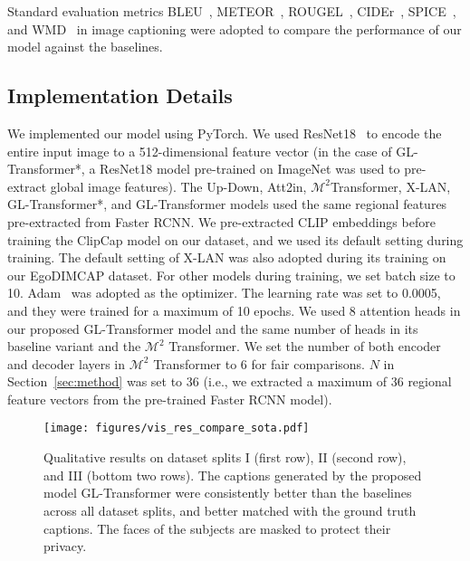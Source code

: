 \documentclass[journal]{IEEEtran}
\begin{document}
Standard evaluation metrics BLEU~\cite{papineni2002bleu}, METEOR~\cite{denkowski2014meteor}, ROUGEL~\cite{lin2004rouge}, CIDEr~\cite{vedantam2015cider}, SPICE~\cite{anderson2016spice}, and WMD~\cite{kusner2015word} in image captioning were adopted to compare the performance of our model against the baselines.

\subsection{Implementation Details}\label{subsec:implementation_details}

We implemented our model using PyTorch. We used ResNet18~\cite{he2016deep} to encode the entire input image to a 512-dimensional feature vector (in the case of GL-Transformer*, a ResNet18 model pre-trained on ImageNet was used to pre-extract global image features). The Up-Down, Att2in, $\mathcal{M}^2$Transformer, X-LAN, GL-Transformer*, and GL-Transformer models used the same regional features pre-extracted from Faster RCNN. We pre-extracted CLIP embeddings before training the ClipCap model on our dataset, and we used its default setting during training. The default setting of X-LAN was also adopted during its training on our EgoDIMCAP dataset. For other models during training, we set batch size to 10. Adam~\cite{kingma2014adam} was adopted as the optimizer. The learning rate was set to 0.0005, and they were trained for a maximum of 10 epochs. We used 8 attention heads in our proposed GL-Transformer model and the same number of heads in its baseline variant and the $\mathcal{M}^2$ Transformer. We set the number of both encoder and decoder layers in $\mathcal{M}^2$ Transformer to 6 for fair comparisons. $N$ in Section~\ref{sec:method} was set to 36 (i.e., we extracted a maximum of 36 regional feature vectors from the pre-trained Faster RCNN model).





\begin{figure*}[!t]
\centerline{\texttt{[image: figures/vis\_res\_compare\_sota.pdf]}}
\caption{Qualitative results on dataset splits I (first row), II (second row), and III (bottom two rows). The captions generated by the proposed model GL-Transformer were consistently better than the baselines across all dataset splits, and better matched with the ground truth captions. The faces of the subjects are masked to protect their privacy.}
\label{fig:vis_res_compare_sota}

\end{figure*}
\end{document}
